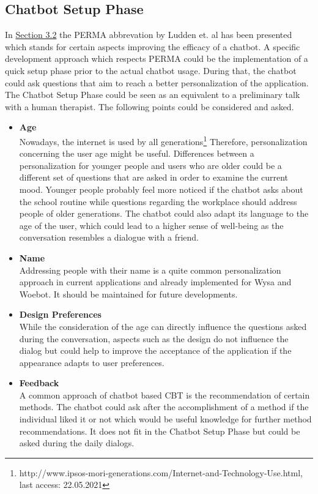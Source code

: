 \documentclass[sigconf, nonacm]{acmart}
\begin{document}
\subsection{Chatbot Setup Phase}
\label{sec:four_two}
In \hyperref[sec:three_two]{Section 3.2} the PERMA abbrevation by Ludden et. al \cite{Ludden2015} has been presented which stands for certain aspects improving the efficacy of a chatbot. A specific development approach which respects PERMA could be the implementation of a quick setup phase prior to the actual chatbot usage.
During that, the chatbot could ask questions that aim to reach a better personalization of the application. The Chatbot Setup Phase could be seen as an equivalent to a preliminary talk with a human therapist. The following points could be considered and asked.
\\
\begin{itemize}
\item\textbf{Age}\\ 
Nowadays, the internet is used by all generations\footnote{http://www.ipsos-mori-generations.com/Internet-and-Technology-Use.html, last access: 22.05.2021}
Therefore, personalization concerning the user age might be useful. Differences between a personalization for younger people and users who are older could be a different set of questions that are asked in order to examine the current mood.
Younger people probably feel more noticed if the chatbot asks about the school routine while questions regarding the workplace should address people of older generations.
The chatbot could also adapt its language to the age of the user, which could lead to a higher sense of well-being as the conversation resembles a dialogue with a friend. 
\\
\item\textbf{Name}\\
Addressing people with their name is a quite common personalization approach in current applications and already implemented for Wysa and Woebot. It should be maintained for future developments.
\\
\item\textbf{Design Preferences}\\
While the consideration of the age can directly influence the questions asked during the conversation, aspects such as the design do not influence the dialog but could help to improve the acceptance of the application if the appearance adapts to user preferences. 
\\
\item\textbf{Feedback}\\
A common approach of chatbot based CBT is the recommendation of certain methods. The chatbot could ask after the accomplishment of a method if the individual liked it or not which would be useful knowledge for further method recommendations. It does not fit in the Chatbot Setup Phase but could
be asked during the daily dialogs.
\\
\end{itemize} 
\end{document}
